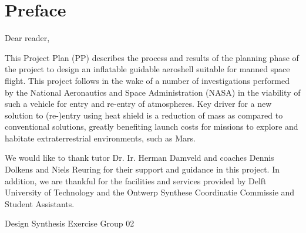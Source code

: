 \section*{Preface}\label{cha:preface}

Dear reader,	


This Project Plan (PP) describes the process and results of the planning phase of the project to design an inflatable guidable aeroshell suitable for manned space flight. This project follows in the wake of a number of investigations performed by the National Aeronautics and Space Administration (NASA) in the viability of such a vehicle for entry and re-entry of atmospheres. Key driver for a new solution to (re-)entry using heat shield is a reduction of mass as compared to conventional solutions, greatly benefiting launch costs for missions to explore and habitate extraterrestrial environments, such as Mars. 

We would like to thank tutor Dr. Ir. Herman Damveld and coaches Dennis Dolkens and Niels Reuring for their support and guidance in this project. In addition, we are thankful for the facilities and services provided by Delft University of Technology and the Ontwerp Synthese Coordinatie Commissie and Student Assistants.

Design Synthesis Exercise Group 02